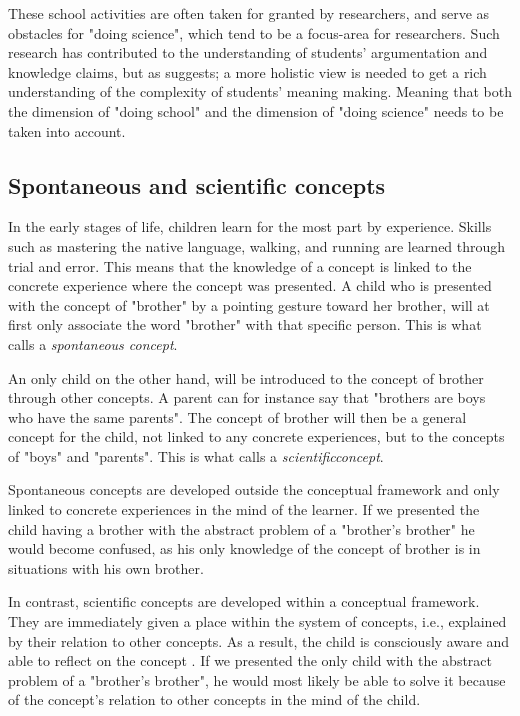 These school activities are often taken for granted by researchers, and serve as obstacles for "doing science", which tend to be a focus-area for researchers. Such research has contributed to the understanding of students' argumentation and knowledge claims, but as \citet*{furberg2008students} suggests; a more holistic view is needed to get a rich understanding of the complexity of students' meaning making. Meaning that both the dimension of "doing school" and the dimension of "doing science" needs to be taken into account. 

\subsection{Spontaneous and scientific concepts} \label{cha:spontaneous_scientific}
In the early stages of life, children learn for the most part by experience. Skills such as mastering the native language, walking, and running are learned through trial and error. This means that the knowledge of a concept is linked to the concrete experience where the concept was presented. A child who is presented with the concept of "brother" by a pointing gesture toward her brother, will at first only associate the word "brother" with that specific person. This is what \citeauthor{vygotsky2012thought} calls a \emph{spontaneous concept}.

An only child on the other hand, will be introduced to the concept of brother through other concepts. A parent can for instance say that "brothers are boys who have the same parents". The concept of brother will then be a general concept for the child, not linked to any concrete experiences, but to the concepts of "boys" and "parents". This is what \citeauthor{vygotsky2012thought} calls a \emph{scientificconcept}.

Spontaneous concepts are developed outside the conceptual framework and only linked to concrete experiences in the mind of the learner. If we presented the child having a brother with the abstract problem of a "brother's brother" \citep{vygotsky2012thought} he would become confused, as his only knowledge of the concept of brother is in situations with his own brother.

In contrast, scientific concepts are developed within a conceptual framework. They are immediately given a place within the system of concepts, i.e., explained by their relation to other concepts. As a result, the child is consciously aware and able to reflect on the concept \citep{van1998concept}. If we presented the only child with the abstract problem of a "brother's brother", he would most likely be able to solve it because of the concept's relation to other concepts in the mind of the child. 

